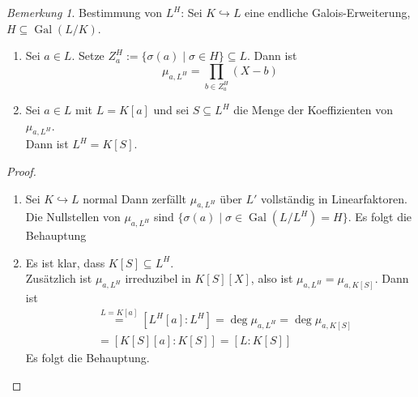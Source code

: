 \documentclass[10pt,a4paper]{article}
\newcommand{\Gal}{\ensuremath{\operatorname{Gal}}}
\newcounter{thm}[section]
\theoremstyle{definition}
\theoremstyle{plain}
\theoremstyle{remark}
\newtheorem{bem}[thm]{Bemerkung}
\begin{document}
\begin{bem}
	Bestimmung von $L^H$: Sei $K\hookrightarrow L$ eine endliche Galois-Erweiterung, $H\subseteq \Gal(L/K)$.
	\begin{enumerate}
		\item Sei $a\in L$. Setze $Z_a^H:=\{\sigma(a)\mid\sigma\in H\}\subseteq L$. Dann ist
		\[\mu_{a,L^H}=\prod_{b\in Z_a^H}(X-b)\]
		\item Sei $a\in L$ mit $L=K[a]$ und sei $S\subseteq L^H$ die Menge der Koeffizienten von $\mu_{a,L^H}$.\\
		Dann ist $L^H=K[S]$.
	\end{enumerate}
\end{bem}
\begin{proof}
	\begin{enumerate}
		\item Sei $K\hookrightarrow L$ normal Dann zerfällt $\mu_{a,L^H}$ über $L'$ vollständig in Linearfaktoren.\\
		Die Nullstellen von $\mu_{a,L^H}$ sind $\{\sigma(a)\mid\sigma\in\Gal(L/L^H)=H\}$. Es folgt die Behauptung
		\item Es ist klar, dass $K[S]\subseteq L^H$.\\
		Zusätzlich ist $\mu_{a,L^H}$ irreduzibel in $K[S][X]$, also ist $\mu_{a,L^H}=\mu_{a,K[S]}$. Dann ist
		\begin{align*}
		[L:L^H]&\overset{L=K[a]}{=}[L^H[a]:L^H]=\deg \mu_{a,L^H}=\deg \mu_{a,K[S]}\\
		&=[K[S][a]:K[S]]=[L:K[S]]
		\end{align*}
		Es folgt die Behauptung.
	\end{enumerate}
\end{proof}
\end{document}
